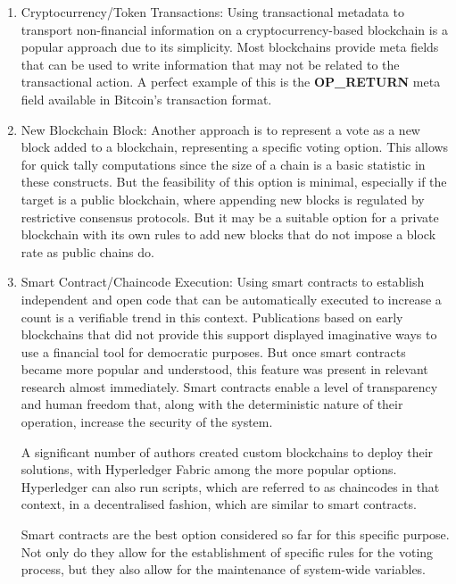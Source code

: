 \documentclass[../access.tex]{subfiles}
\begin{document}
		\begin{enumerate}
			\item{Cryptocurrency/Token Transactions:}
            Using transactional metadata to transport non-financial information on a cryptocurrency-based blockchain is a popular approach due to its simplicity. Most blockchains provide meta fields that can be used to write information that may not be related to the transactional action. A perfect example of this is the \textbf{OP\_RETURN} meta field available in Bitcoin's transaction format.
			
			\item{New Blockchain Block:}
            Another approach is to represent a vote as a new block added to a blockchain, representing a specific voting option. This allows for quick tally computations since the size of a chain is a basic statistic in these constructs. But the feasibility of this option is minimal, especially if the target is a public blockchain, where appending new blocks is regulated by restrictive consensus protocols. But it may be a suitable option for a private blockchain with its own rules to add new blocks that do not impose a block rate as public chains do.
			
			\item{Smart Contract/Chaincode Execution:}
            Using smart contracts to establish independent and open code that can be automatically executed to increase a count is a verifiable trend in this context. Publications based on early blockchains that did not provide this support displayed imaginative ways to use a financial tool for democratic purposes. But once smart contracts became more popular and understood, this feature was present in relevant research almost immediately. Smart contracts enable a level of transparency and human freedom that, along with the deterministic nature of their operation, increase the security of the system.
			\par
            A significant number of authors created custom blockchains to deploy their solutions, with Hyperledger Fabric among the more popular options. Hyperledger can also run scripts, which are referred to as chaincodes in that context, in a decentralised fashion, which are similar to smart contracts.
            \par
            Smart contracts are the best option considered so far for this specific purpose. Not only do they allow for the establishment of specific rules for the voting process, but they also allow for the maintenance of system-wide variables.
		\end{enumerate}
\end{document}
